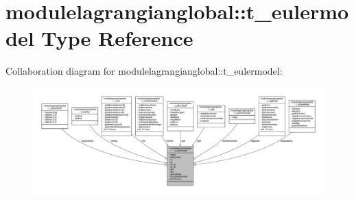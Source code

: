 \hypertarget{structmodulelagrangianglobal_1_1t__eulermodel}{}\section{modulelagrangianglobal\+:\+:t\+\_\+eulermodel Type Reference}
\label{structmodulelagrangianglobal_1_1t__eulermodel}


Collaboration diagram for modulelagrangianglobal\+:\+:t\+\_\+eulermodel\+:\nopagebreak
\begin{figure}[H]
\begin{center}
\leavevmode
\includegraphics[width=350pt]{structmodulelagrangianglobal_1_1t__eulermodel__coll__graph}
\end{center}
\end{figure}
